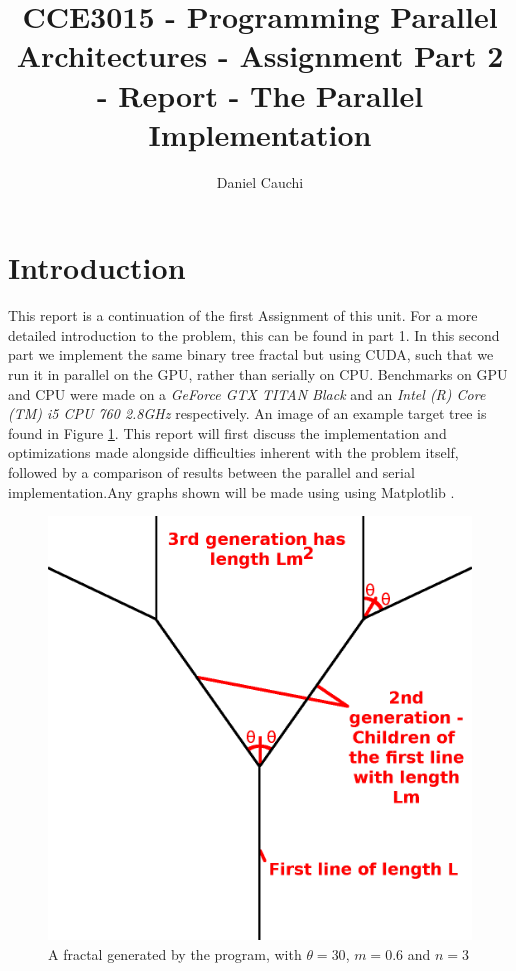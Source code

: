 \documentclass[11pt]{article}
\begin{document}
\title{CCE3015 - Programming Parallel Architectures - Assignment Part 2 - Report - The Parallel Implementation}
\author{Daniel Cauchi}
\date{}
\maketitle

\section{Introduction} \label{intro}
This report is a continuation of the first Assignment of this unit. For a more detailed introduction to the problem, this can be found in part 1. In this second part we implement the same binary tree fractal but using CUDA, such that we run it in parallel on the GPU, rather than serially on CPU. Benchmarks on GPU and CPU were made on a \textit{GeForce GTX TITAN Black} and an \textit{Intel (R) Core (TM) i5 CPU 760 2.8GHz} respectively. An image of an example target tree is  found in Figure \ref{general explanation}. This report will first discuss the implementation and optimizations made alongside difficulties inherent with the problem itself, followed by a comparison of results between the parallel and serial implementation.Any graphs shown will be made using using Matplotlib \cite{matplotlib}.

\begin{figure}
	\includegraphics[width=.95\linewidth]{Images/GeneralExplanation.png}
	\centering
	\caption{A fractal generated by the program, with $\theta=30$, $m=0.6$ and $n=3$}
	\label{general explanation}
\end{figure}
\end{document}
